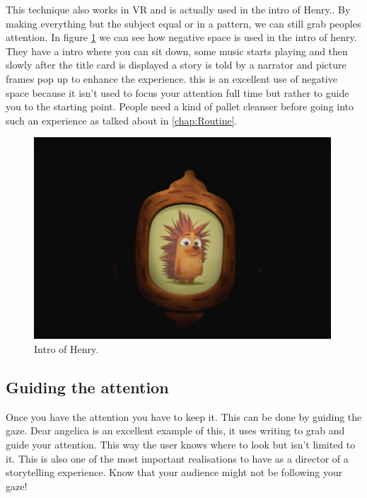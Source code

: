 \documentclass{report}
\begin{document}
				This technique also works in VR and is actually used in the intro of Henry..	By making everything but the subject equal or in a pattern, we can still grab peoples attention. 				
				In figure \ref{fig:henryIntro} we can see how negative space is used in the intro of henry. They have a intro where you can sit down, some music starts playing and then slowly after the title card is displayed a story is told by a narrator and picture frames pop up to enhance the experience. this is an excellent use of negative space because it isn't used to focus your attention full time but rather to guide you to the starting point. People need a kind of pallet cleanser before going into such an experience as talked about in \autoref{chap:Routine}.
				
				\begin{figure}[h!]
					\centering
					 \includegraphics[width=30em]{img/henry_intro.png}
					\caption{Intro of Henry.}
					\label{fig:henryIntro}
				\end{figure}
				\subsection{Guiding the attention} 
				
				Once you have the attention you have to keep it. This can be done by guiding the gaze. Dear angelica is an excellent example of this, it uses writing to grab and guide your attention. This way the user knows where to look but isn't limited to it. This is also one of the most important realisations to have as a director of a storytelling experience. Know that your audience might not be following your gaze!
				
\end{document}
